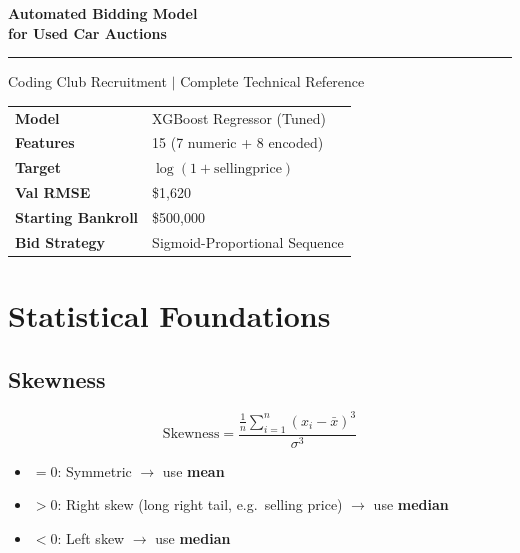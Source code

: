 \documentclass[12pt,a4paper]{article}
\begin{document}
\begin{titlepage}
  \centering\vspace*{3cm}
  {\Huge\bfseries\color{darkblue}Automated Bidding Model\\[0.4em]
   \large\color{accent}for Used Car Auctions\par}
  \vspace{1cm}\rule{\linewidth}{1pt}\vspace{0.5cm}
  {\large Coding Club Recruitment $|$ Complete Technical Reference\par}
  \vspace{2cm}
  \begin{tabular}{ll}\toprule
    \textbf{Model} & XGBoost Regressor (Tuned)\\
    \textbf{Features} & 15 (7 numeric + 8 encoded)\\
    \textbf{Target} & $\log(1+\text{sellingprice})$\\
    \textbf{Val RMSE} & \$1,620\\
    \textbf{Starting Bankroll} & \$500,000\\
    \textbf{Bid Strategy} & Sigmoid-Proportional Sequence\\\bottomrule
  \end{tabular}\vfill
\end{titlepage}

\tableofcontents\newpage

\section{Statistical Foundations}

\subsection{Skewness}
\begin{formulabox}
\[\text{Skewness}=\frac{\frac{1}{n}\sum_{i=1}^{n}(x_i-\bar{x})^3}{\sigma^3}\]
\end{formulabox}
\begin{itemize}
  \item $=0$: Symmetric $\rightarrow$ use \textbf{mean}
  \item $>0$: Right skew (long right tail, e.g.\ selling price) $\rightarrow$ use \textbf{median}
  \item $<0$: Left skew $\rightarrow$ use \textbf{median}
\end{itemize}
\end{document}
